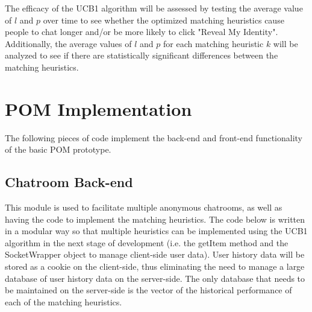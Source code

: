 \documentclass{article}
\begin{document}
The efficacy of the UCB1 algorithm will be assessed by testing the average value of $l$ and $p$ over time to see whether the optimized matching heuristics cause people to chat longer and/or be more likely to click "Reveal My Identity". Additionally, the average values of $l$ and $p$ for each matching heuristic $k$ will be analyzed to see if there are statistically significant differences between the matching heuristics.

\section{POM Implementation}

The following pieces of code implement the back-end and front-end functionality of the basic POM prototype. 

\subsection{Chatroom Back-end} 

This module is used to facilitate multiple anonymous chatrooms, as well as having the code to implement the matching heuristics. The code below is written in a modular way so that multiple heuristics can be implemented using the UCB1 algorithm in the next stage of development (i.e. the getItem method and the SocketWrapper object to manage client-side user data). User history data will be stored as a cookie on the client-side, thus eliminating the need to manage a large database of user history data on the server-side. The only database that needs to be maintained on the server-side is the vector of the historical performance of each of the matching heuristics.
\end{document}
